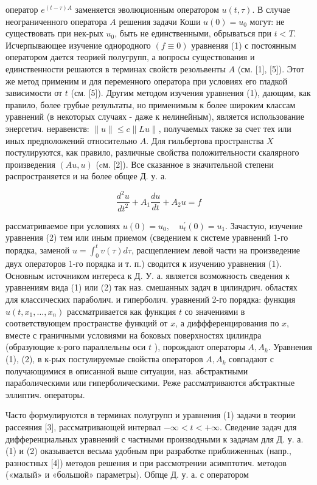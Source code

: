 \documentclass[10pt]{article}
\begin{document}
оператор $e^{(t-\tau) A}$ заменяется эволюционным оператором $u(t, \tau)$. В случае неограниченного оператора $A$ решения задачи Коши $u(0)=u_{0}$ могут: не существовать при нек-рых $u_{0}$, быть не единственными, обрываться при $t<T$. Исчерпывающее изучение однородного $(f \equiv 0)$ уравненяя (1) с постоянным оператором дается теорией полугрупп, а вопросы существования и единственности решаются в терминах свойств резольвенты $A$ (см. [1], [5]). Этот же метод применим и для переменного оператора при условиях его гладкой зависимости от $t$ (см. [5]). Другим методом изучения уравнения (1), дающим, как правило, более грубые результаты, но применимым к более широким классам уравнений (в некоторых случаях - даже к нелинейным), является использование энергетич. неравенств: $\|u\| \leqslant c\|L u\|$, получаемых также за счет тех или иных предположений относительно $A$. Для гильбертова пространства $X$ постулируются, как правило, различные свойства положительности скалярного произведения $(A u, u)$ (cм. [2]). Все сказанное в значительной степени распространяется и на более общее Д. у. а.



\[

\frac{d^{2} u}{d t^{2}}+A_{1} \frac{d u}{d t}+A_{2} u=f

\]



рассматриваемое при условиях $u(0)=u_{0}, \quad u_{t}^{\prime}(0)=u_{1}$. Зачастую, изучение уравнения (2) тем или иным приемом (сведением к системе уравнений 1-го порядка, заменой $u=\int_{0}^{t} v(\tau) d \tau$, расщеплением левой части на произведение двух операторов 1-го порядка и т. п.) сводится к изучению уравнения (1). Основным источником интереса к Д. У. а. является возможность сведения к уравнениям вида (1) или (2) так наз. смешанных задач в цилиндрич. областях для классических параболич. и гиперболич. уравнений 2-го порядка: функция $u\left(t, x_{1}, \ldots, x_{n}\right)$ рассматривается как функция $t$ со значениями в соответствующем пространстве функций от $x$, а диффференцирования по $x$, вместе с граничными условиями на боковых поверхностях цилиндра (образующие к-рого параллельны оси $t$ ), порождают операторы $A, A_{k}$. Уравнения (1), (2), в к-рых постулируемые свойства операторов $A, A_{k}$ совпадают с получающимися в описанной выше ситуации, наз. абстрактными параболическими или гиперболическими. Реже рассматриваются абстрактные эллиптич. операторы.



Часто формулируются в терминах полугрупп и уравнения (1) задачи в теории рассеяния [3], рассматривающей интервал $-\infty<t<+\infty$. Сведение задач для дифференциальных уравнений с частными производными к задачам для Д. у. а. (1) и (2) оказывается весьма удобным при разработке приближенных (напр., разностных [4]) методов решения и при рассмотрении асимптотич. методов («малый» и «большой» параметры). Обпце Д. у. а. с оператором
\end{document}
